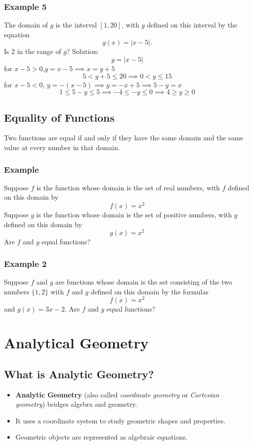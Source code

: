 \subsubsection{Example 5}
The domain of \(g\) is the interval \([1,20]\), with \(g\) defined on this interval by the equation
\[ g(x) = |x - 5|. \]
Is \(2\) in the range of \(g\)?
Solution:
\[ y =  |x-5| \]
for \(x-5>0 \),\(y = x-5 \implies x = y+5 \)
\[ 5 < y+5 \leq 20  \implies  0 < y \leq 15 \]
for \(x-5<0 \), \(y = -(x-5) \implies y = -x+5 \implies 5-y = x \)
\[ 1 \leq 5-y \leq 5  \implies -4 \leq -y \leq 0 \implies  4 \geq y \geq 0 \]

\subsection{Equality of Functions}
Two functions are equal if and only if they have the same domain and the same value at every number in that domain.

\subsubsection{Example}
Suppose \(f\) is the function whose domain is the set of real numbers, with \(f\) defined on this domain by
\[f (x) = x^2\]
Suppose \(g\) is the function whose domain is the set of positive numbers, with \(g\) defined on this domain by
\[g(x) = x^2\]
Are \(f\) and \(g\) equal functions?

\subsubsection{Example 2}
Suppose \(f\) and \(g\) are functions whose domain is the set consisting of the two numbers \(\{1, 2\}\) with \(f\) and \(g\) defined on this domain by the formulas
\[f (x) = x^2\] and \(g(x) = 3x-2\).
Are \(f\) and \(g\) equal functions?

\section{Analytical Geometry}
\subsection{What is Analytic Geometry?}
\begin{itemize}
    \item \textbf{Analytic Geometry} (also called \textit{coordinate geometry} or \textit{Cartesian geometry}) bridges algebra and geometry.
    \item It uses a coordinate system to study geometric shapes and properties.
    \item Geometric objects are represented as algebraic equations.
\end{itemize}

